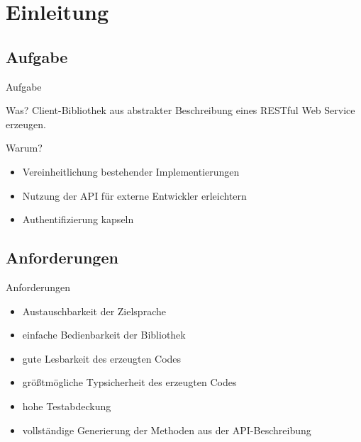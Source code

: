 \section{Einleitung}

\subsection{Aufgabe}
\begin{frame}{Aufgabe}
    \begin{block}{Was?}
        Client-Bibliothek aus abstrakter Beschreibung eines RESTful Web Service erzeugen.
    \end{block}

    \begin{block}{Warum?}
        \begin{itemize}
            \item Vereinheitlichung bestehender Implementierungen
            \item Nutzung der API für externe Entwickler erleichtern
            \item Authentifizierung kapseln
        \end{itemize}
    \end{block}
\end{frame}

\subsection{Anforderungen}
\begin{frame}{Anforderungen}
    \begin{itemize}
        \item Austauschbarkeit der Zielsprache
        \item einfache Bedienbarkeit der Bibliothek
        \item gute Lesbarkeit des erzeugten Codes
        \item größtmögliche Typsicherheit des erzeugten Codes
        \item {\color{gray} hohe Testabdeckung}
        \item vollständige Generierung der Methoden aus der API-Beschreibung
    \end{itemize}
\end{frame}

